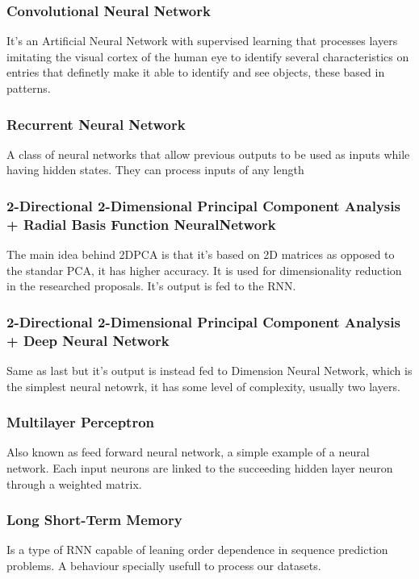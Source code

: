 \documentclass[conference]{IEEEtran}
\begin{document}
\subsubsection{Convolutional Neural Network}
It's an Artificial Neural Network with supervised learning that processes layers imitating the visual cortex
of the human eye to identify several characteristics on entries that definetly make it able to identify and see objects, these based in patterns.
\subsubsection{Recurrent Neural Network}
A class of neural networks that allow previous outputs to be used as inputs while having hidden states. They can process inputs of any length
\subsubsection{2-Directional 2-Dimensional Principal Component Analysis + Radial Basis Function NeuralNetwork}
The main idea behind 2DPCA is that it's based on 2D matrices as opposed to the standar PCA, it has higher accuracy. It is used for dimensionality reduction in
the researched proposals. It's output is fed to the RNN.
\subsubsection{2-Directional 2-Dimensional Principal Component Analysis + Deep Neural Network}
Same as last but it's output is instead fed to Dimension Neural Network, which is the simplest neural netowrk, it has some level of complexity, usually two layers.
\subsubsection{Multilayer Perceptron}
Also known as feed forward neural network, a simple example of a neural network. Each input neurons are linked to the succeeding hidden layer neuron
through a weighted matrix.
\subsubsection{Long Short-Term Memory}
Is a type of RNN capable of leaning order dependence in sequence prediction problems. A behaviour specially usefull to process our datasets. 
\end{document}
